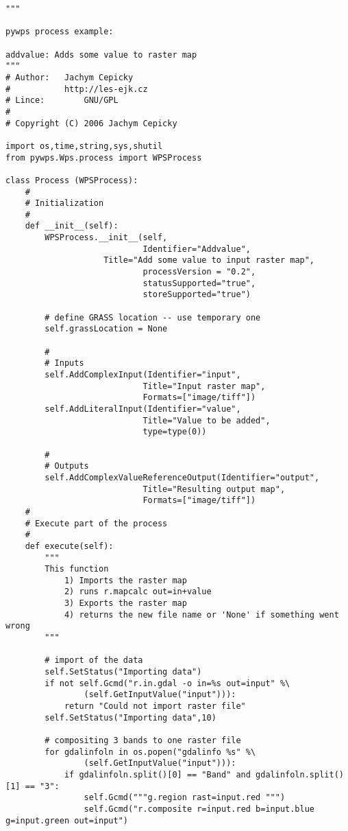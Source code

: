 \documentclass[a4paper,11pt]{article}
\begin{document}
    \begin{verbatim}
"""

pywps process example:

addvalue: Adds some value to raster map
"""
# Author:	Jachym Cepicky
#        	http://les-ejk.cz
# Lince:        GNU/GPL
# 
# Copyright (C) 2006 Jachym Cepicky

import os,time,string,sys,shutil
from pywps.Wps.process import WPSProcess

class Process (WPSProcess):
    #
    # Initialization
    #
    def __init__(self):
        WPSProcess.__init__(self,
                            Identifier="Addvalue",
                    Title="Add some value to input raster map",
                            processVersion = "0.2",
                            statusSupported="true",
                            storeSupported="true")

        # define GRASS location -- use temporary one
        self.grassLocation = None

        #
        # Inputs
        self.AddComplexInput(Identifier="input",
                            Title="Input raster map", 
                            Formats=["image/tiff"])
        self.AddLiteralInput(Identifier="value",
                            Title="Value to be added",
                            type=type(0))

        #
        # Outputs
        self.AddComplexValueReferenceOutput(Identifier="output",
                            Title="Resulting output map",
                            Formats=["image/tiff"])
    #
    # Execute part of the process
    #
    def execute(self):
        """
        This function
            1) Imports the raster map
            2) runs r.mapcalc out=in+value
            3) Exports the raster map
            4) returns the new file name or 'None' if something went wrong
        """

        # import of the data
        self.SetStatus("Importing data")
        if not self.Gcmd("r.in.gdal -o in=%s out=input" %\
                (self.GetInputValue("input"))):
            return "Could not import raster file"
        self.SetStatus("Importing data",10)

        # compositing 3 bands to one raster file
        for gdalinfoln in os.popen("gdalinfo %s" %\
                (self.GetInputValue("input"))):
            if gdalinfoln.split()[0] == "Band" and gdalinfoln.split()[1] == "3":
                self.Gcmd("""g.region rast=input.red """)
                self.Gcmd("r.composite r=input.red b=input.blue g=input.green out=input")


\end{verbatim}
\end{document}
